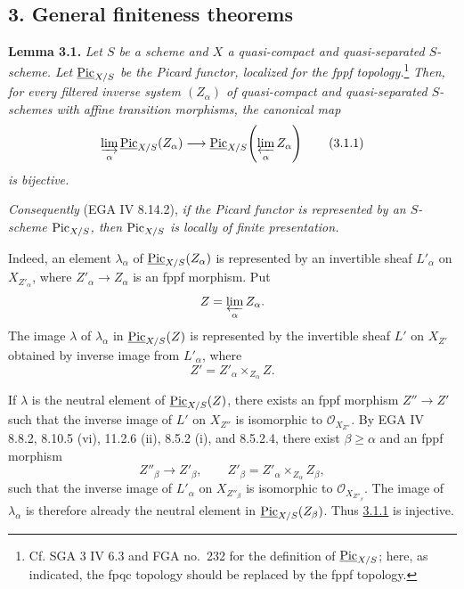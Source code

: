 \subsection*{3. General finiteness theorems}

\textbf{Lemma 3.1.} \emph{Let \(S\) be a scheme and \(X\) a
quasi-compact and quasi-separated \(S\)-scheme. Let
\(\underline{\operatorname{Pic}}_{X/S}\) be the Picard functor, localized for the fppf
topology.}\footnote{Cf. SGA 3 IV 6.3 and FGA no.~232 for the definition of
\(\underline{\operatorname{Pic}}_{X/S}\); here, as indicated, the fpqc topology should be
replaced by the fppf topology.}
\emph{Then, for every filtered inverse system \((Z_\alpha)\) of
quasi-compact and quasi-separated \(S\)-schemes with affine transition
morphisms, the canonical map}
\begin{equation}
\varinjlim_\alpha\underline{\operatorname{Pic}}_{X/S}(Z_\alpha)
\longrightarrow
\underline{\operatorname{Pic}}_{X/S}\!\left(\varprojlim_\alpha Z_\alpha\right)
\tag{3.1.1}
\end{equation}
\emph{is bijective.}

\emph{Consequently} (EGA IV 8.14.2), \emph{if the Picard functor is
represented by an \(S\)-scheme \(\operatorname{Pic}_{X/S}\), then \(\operatorname{Pic}_{X/S}\) is
locally of finite presentation.}

Indeed, an element \(\lambda_\alpha\) of
\(\underline{\operatorname{Pic}}_{X/S}(Z_\alpha)\) is represented by an invertible sheaf
\(L'_\alpha\) on \(X_{Z'_\alpha}\), where
\(Z'_\alpha\to Z_\alpha\) is an fppf morphism. Put
\[
Z=\varprojlim_\alpha Z_\alpha.
\]
The image \(\lambda\) of \(\lambda_\alpha\) in
\(\underline{\operatorname{Pic}}_{X/S}(Z)\) is represented by the invertible sheaf
\(L'\) on \(X_{Z'}\) obtained by inverse image from \(L'_\alpha\), where
\[
Z'=Z'_\alpha\times_{Z_\alpha}Z.
\]

If \(\lambda\) is the neutral element of
\(\underline{\operatorname{Pic}}_{X/S}(Z)\), there exists an fppf morphism
\(Z''\to Z'\) such that the inverse image of \(L'\) on \(X_{Z''}\) is
isomorphic to \(\mathcal O_{X_{Z''}}\). By EGA IV 8.8.2, 8.10.5 (vi),
11.2.6 (ii), 8.5.2 (i), and 8.5.2.4, there exist
\(\beta\ge\alpha\) and an fppf morphism
\[
Z''_\beta\longrightarrow Z'_\beta,
\qquad
Z'_\beta=Z'_\alpha\times_{Z_\alpha}Z_\beta,
\]
such that the inverse image of \(L'_\alpha\) on \(X_{Z''_\beta}\) is
isomorphic to \(\mathcal O_{X_{Z''_\beta}}\). The image of
\(\lambda_\alpha\) is therefore already the neutral element in
\(\underline{\operatorname{Pic}}_{X/S}(Z_\beta)\). Thus \hyperlink{sga6.e13.eq.3-1-1}{3.1.1} is injective.

